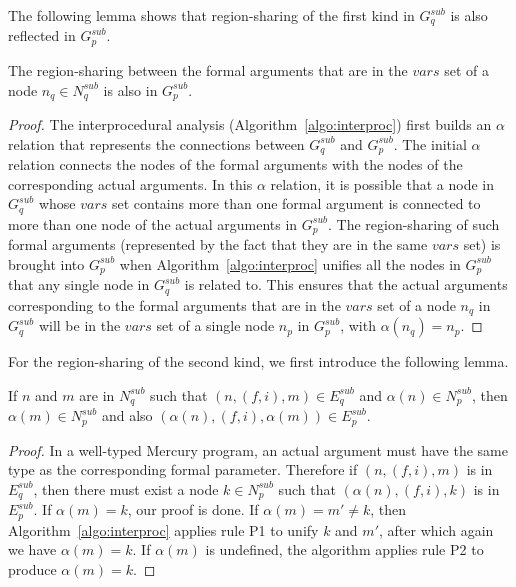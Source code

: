 \documentclass{tlp}
\def\varset{\mathit{vars}}
\begin{document}
The following lemma shows that
region-sharing of the first kind in $G^{sub}_q$
is also reflected in $G^{sub}_p$.
\begin{lemma}
\label{lemma:sharing_same_node}
The region-sharing between the formal arguments that are in the
$\varset$ set of a node $n_q \in N^{sub}_q$ is also in $G^{sub}_p$.
\end{lemma}
\begin{proof}
The interprocedural analysis (Algorithm~\ref{algo:interproc})
first builds an $\alpha$ relation
that represents the connections between $G^{sub}_q$ and $G^{sub}_p$.
The initial $\alpha$ relation connects
the nodes of the formal arguments with
the nodes of the corresponding actual arguments.
In this $\alpha$ relation, it is possible that a node in $G^{sub}_q$
whose $\varset$ set contains more than one formal argument
is connected to more than one node of the actual arguments in $G^{sub}_p$.
The region-sharing of such formal arguments
(represented by the fact that they are in the same $\varset$ set)
is brought into $G^{sub}_p$ when Algorithm~\ref{algo:interproc}
unifies all the nodes in $G^{sub}_p$
that any single node in $G^{sub}_q$ is related to.
This ensures that the actual arguments corresponding to the formal arguments
that are in the $\varset$ set of a node $n_q$ in $G^{sub}_q$
will be in the $\varset$ set of a single node $n_p$ in $G^{sub}_p$,
with $\alpha(n_q) = n_p$.
\end{proof}

For the region-sharing of the second kind,
we first introduce the following lemma.
\begin{lemma}
\label{lemma:sharing_diff_nodes}
If $n$ and $m$ are in $N^{sub}_q$ such that
$(n, (f,i), m) \in E^{sub}_q$
and $\alpha(n) \in N^{sub}_p$,
then $\alpha(m) \in N^{sub}_p$
and also $(\alpha(n), (f,i), \alpha(m)) \in E^{sub}_p$.
\end{lemma}
\begin{proof}
In a well-typed Mercury program,
an actual argument must have the same type
as the corresponding formal parameter.
Therefore if $(n, (f,i), m)$ is in $E^{\mathit{sub}}_q$,
then there must exist a node $k \in N^{\mathit{sub}}_p$ such that
$(\alpha(n), (f,i), k)$ is in $E^{\mathit{sub}}_p$.
If $\alpha(m) = k$, our proof is done.
If $\alpha(m) = m' \not= k$,
then Algorithm~\ref{algo:interproc}
applies rule P1 to unify $k$ and $m'$,
after which again we have $\alpha(m) = k$.
If $\alpha(m)$ is undefined,
the algorithm applies rule P2 to produce $\alpha(m) = k$.
\end{proof}
\end{document}
